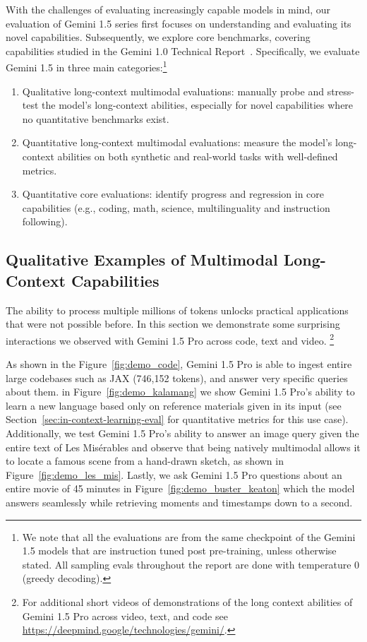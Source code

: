 With the challenges of evaluating increasingly capable models in mind, our evaluation of Gemini 1.5 series first focuses on understanding and evaluating its novel capabilities. Subsequently, we explore core benchmarks, covering capabilities studied in the Gemini 1.0 Technical Report~\citep{geminiteam2023gemini}. Specifically, we evaluate Gemini 1.5 in three main categories:\footnote{We note that all the evaluations are from the same checkpoint of the Gemini 1.5 models that are instruction tuned post pre-training, unless otherwise stated. All sampling evals throughout the report are done with temperature 0 (greedy decoding).}

\begin{enumerate}
    \item Qualitative long-context multimodal evaluations: manually probe and stress-test the model's long-context abilities, especially for novel capabilities where no quantitative benchmarks exist.
    \item Quantitative long-context multimodal evaluations: measure the model's long-context abilities on both synthetic and real-world tasks with well-defined metrics.
    \item Quantitative core evaluations: identify progress and regression in core capabilities (e.g., coding, math, science, multilinguality and instruction following).
\end{enumerate}

\subsection{Qualitative Examples of Multimodal Long-Context Capabilities}
\label{sec:eval-qualitative}

 The ability to process multiple millions of tokens unlocks practical applications that were not possible before. In this section we demonstrate some surprising interactions we observed with Gemini 1.5 Pro across code, text and video. \footnote{For additional short videos of demonstrations of the long context abilities of Gemini 1.5 Pro across video, text, and code see \url{https://deepmind.google/technologies/gemini/}.}

As shown in the Figure~\ref{fig:demo_code}, Gemini 1.5 Pro is able to ingest entire large codebases such as JAX (746,152 tokens), and answer very specific queries about them. in Figure~\ref{fig:demo_kalamang} we show Gemini 1.5 Pro's ability to learn a new language based only on reference materials given in its input (see Section~\ref{sec:in-context-learning-eval} for quantitative metrics for this use case). Additionally, we test Gemini 1.5 Pro's ability to answer an image query given the entire text of Les Misérables and  observe that being natively multimodal allows it to locate a famous scene from a hand-drawn sketch, as shown in Figure~\ref{fig:demo_les_mis}. Lastly, we ask Gemini 1.5 Pro questions about an entire movie of 45 minutes in Figure~\ref{fig:demo_buster_keaton} which the model answers seamlessly while retrieving moments and timestamps down to a second. 

